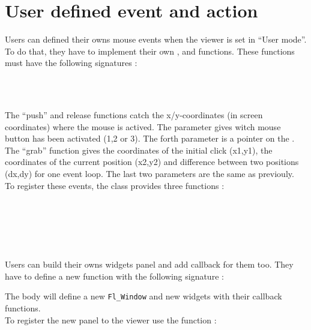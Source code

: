 \section{User defined event and action}

Users can defined their owns mouse events when the viewer is set in
``User mode''. To do that, they have to implement their own ,
 and  functions. These functions must have
the following signatures :

\\
\\


The ``push'' and release functions catch the x/y-coordinates (in
screen coordinates) where the mouse is actived. The 
parameter gives witch mouse button has been activated (1,2 or 3). The forth
parameter is a pointer on the .\\
The ``grab'' function gives the coordinates of the initial click
(x1,y1), the coordinates of the current position (x2,y2) and
difference between two positions (dx,dy) for one event loop. The last
two parameters are the same as previouly.\\
To register these events, the  class provides three
functions : 


  \\
 \\
\\
\\
\\


Users can build their owns widgets panel and add callback for them
too. They have to define a new function with the following signature :



The body will define a new {\tt Fl\_Window} and new widgets with their 
callback functions.\\
To register the new panel to the viewer use the function :



